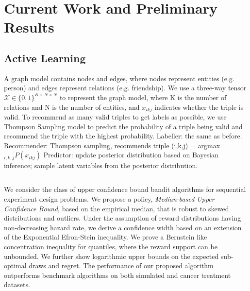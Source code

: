 



\chapter{Current Work and Preliminary Results} \label{ch-1}

\section{Active Learning}

A graph model contains nodes and edges, where nodes represent entities (e.g. person) and edges represent relations (e.g. friendship). We use a three-way tensor $\mathcal{X} \in \{0,1\}^{K \times N \times N}$ to represent the graph model, where K is the number of relations and N is the number of entities, and $x_{ikj}$ indicates whether the triple is valid.\newline
 To recommend as many valid triples to get labels as possible, we use Thompson Sampling model to predict the probability of a triple being valid and recommend the triple with the highest probability. \newline
 \newline
 Labeller: the same as before. \newline
 Recommender: Thompson sampling, recommends triple (i,k,j) = {argmax}$_{i,k,j} P(x_{ikj})$ \newline
 Predictor: update posterior distribution based on Bayesian inference; sample latent variables from the posterior distribution.

\section{\ourtitle}

We consider the class of upper confidence bound bandit algorithms for sequential experiment design problems.
We propose a policy, \emph{Median-based Upper Confidence Bound}, based on the empirical median, that is robust to skewed distributions and outliers.
Under the assumption of reward distributions having non-decreasing hazard rate,
we derive a confidence width based on an extension of the Exponential Efron-Stein inequality.
We prove a Bernstein like concentration inequality for quantiles, where the reward support can be unbounded. We further show logarithmic upper bounds on the expected sub-optimal draws and regret.
The performance of our proposed algorithm outperforms benchmark algorithms on both simulated and cancer treatment datasets.

